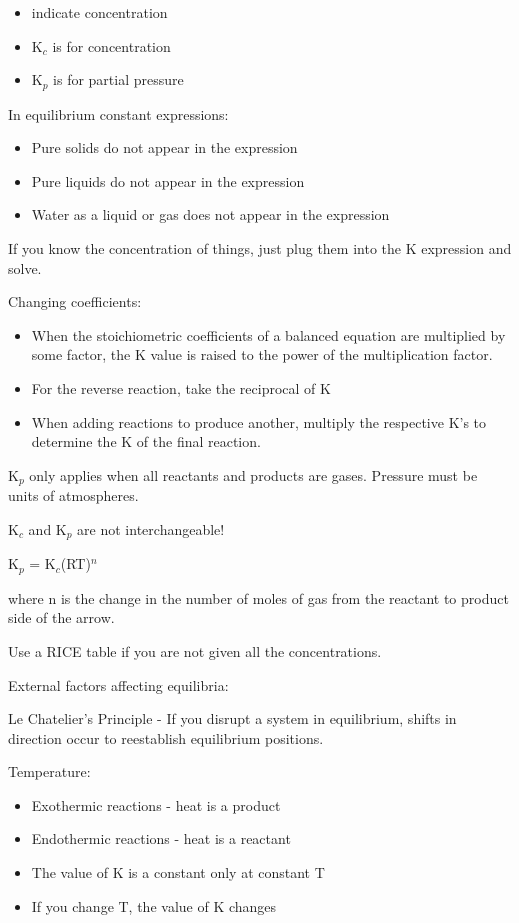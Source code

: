 \documentclass[../hchem.tex]{subfiles}
\begin{document}
\begin{itemize}
    \item [] indicate concentration 
    \item K$_c$ is for concentration 
    \item K$_p$ is for partial pressure 
\end{itemize}

In equilibrium constant expressions:
\begin{itemize}
    \item Pure solids do not appear in the expression 
    \item Pure liquids do not appear in the expression 
    \item Water as a liquid or gas does not appear in the expression 
\end{itemize}

If you know the concentration of things, just plug them into the K expression and solve.

Changing coefficients:
\begin{itemize}
    \item When the stoichiometric coefficients of a balanced equation are multiplied by some factor, the K value is raised to the power of the multiplication factor.
    \item For the reverse reaction, take the reciprocal of K 
    \item When adding reactions to produce another, multiply the respective K's to determine the K of the final reaction.
\end{itemize}

K$_p$ only applies when all reactants and products are gases. Pressure must be units of atmospheres.

K$_c$ and K$_p$ are not interchangeable!
\begin{center}
    K$_p$ = K$_c$(RT)$^n$
\end{center}
where n is the change in the number of moles of gas from the reactant to product side of the arrow.

Use a RICE table if you are not given all the concentrations.

External factors affecting equilibria:

Le Chatelier's Principle - If you disrupt a system in equilibrium, shifts in direction occur to reestablish equilibrium positions.

Temperature:
\begin{itemize}
    \item Exothermic reactions - heat is a product
    \item Endothermic reactions - heat is a reactant 
    \item The value of K is a constant only at constant T 
    \item If you change T, the value of K changes  
\end{itemize}
\end{document}
